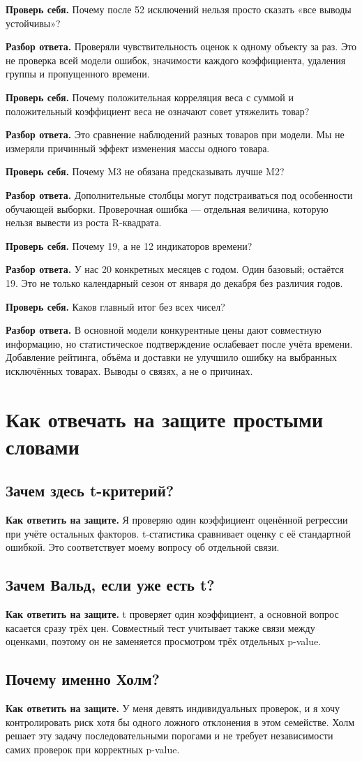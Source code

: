 \documentclass[12pt,a4paper]{article}
\newcommand{\check}[2]{\par\textbf{Проверь себя.} #1\par\textbf{Разбор ответа.} #2\par}
\newcommand{\answer}[1]{\par\textbf{Как ответить на защите.} #1\par}
\begin{document}
\check{Почему после 52 исключений нельзя просто сказать «все выводы устойчивы»?}{Проверяли чувствительность оценок к одному объекту за раз. Это не проверка всей модели ошибок, значимости каждого коэффициента, удаления группы и пропущенного времени.}

\check{Почему положительная корреляция веса с суммой и положительный коэффициент веса не означают совет утяжелить товар?}{Это сравнение наблюдений разных товаров при модели. Мы не измеряли причинный эффект изменения массы одного товара.}

\check{Почему M3 не обязана предсказывать лучше M2?}{Дополнительные столбцы могут подстраиваться под особенности обучающей выборки. Проверочная ошибка --- отдельная величина, которую нельзя вывести из роста R-квадрата.}

\check{Почему 19, а не 12 индикаторов времени?}{У нас 20 конкретных месяцев с годом. Один базовый; остаётся 19. Это не только календарный сезон от января до декабря без различия годов.}

\check{Каков главный итог без всех чисел?}{В основной модели конкурентные цены дают совместную информацию, но статистическое подтверждение ослабевает после учёта времени. Добавление рейтинга, объёма и доставки не улучшило ошибку на выбранных исключённых товарах. Выводы о связях, а не о причинах.}

\section{Как отвечать на защите простыми словами}

\subsection*{Зачем здесь t-критерий?}
\answer{Я проверяю один коэффициент оценённой регрессии при учёте остальных факторов. t-статистика сравнивает оценку с её стандартной ошибкой. Это соответствует моему вопросу об отдельной связи.}

\subsection*{Зачем Вальд, если уже есть t?}
\answer{t проверяет один коэффициент, а основной вопрос касается сразу трёх цен. Совместный тест учитывает также связи между оценками, поэтому он не заменяется просмотром трёх отдельных p-value.}

\subsection*{Почему именно Холм?}
\answer{У меня девять индивидуальных проверок, и я хочу контролировать риск хотя бы одного ложного отклонения в этом семействе. Холм решает эту задачу последовательными порогами и не требует независимости самих проверок при корректных p-value.}
\end{document}
